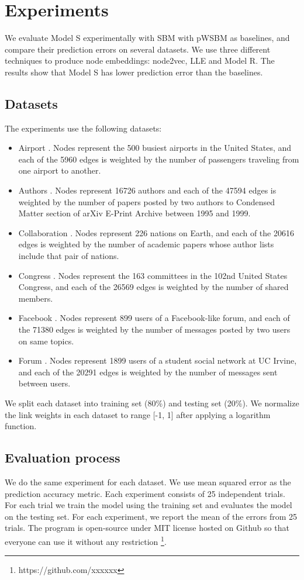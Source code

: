 \documentclass{article} %
\begin{document}
\section{Experiments} \label{section:experiments}
We evaluate Model S experimentally with SBM with pWSBM as baselines,
and compare their prediction errors on several datasets.
We use three different techniques to produce node embeddings: node2vec, LLE and Model R.
The results show 
that Model S has lower prediction error than the baselines.

\subsection{Datasets}
The experiments use the following datasets:
\begin{itemize}
	\item Airport \citep{colizza2007reaction}. Nodes represent the 500 busiest airports in the United States, and each of the 5960 edges is weighted by the number of passengers traveling from one airport to another.
	\item Authors \citep{newman2001structure}. Nodes represent 16726 authors and each of the 47594 edges is weighted by the number of papers posted by two authors to Condensed Matter section of arXiv E-Print Archive between 1995 and 1999.
	\item Collaboration \citep{pan2012world}. Nodes represent 226 nations on Earth, and each of the 20616 edges is weighted by the number of academic papers whose author lists include that pair of nations.
	\item Congress \citep{porter2005network}. Nodes represent the 163 committees in the 102nd United States Congress, and each of the 26569 edges is weighted by the number of shared members.
	\item Facebook \citep{opsahl2013triadic}. Nodes represent 899 users of a Facebook-like forum, and each of the 71380 edges is weighted by the number of messages posted by two users on same topics.
	\item Forum \citep{opsahl2009clustering}. Nodes represent 1899 users of a student social network at UC Irvine, and each of the 20291 edges is weighted by the number of messages sent between users.
\end{itemize}
We split each dataset into training set (80\%) and testing set (20\%).
We normalize the link weights in each dataset to range [-1, 1] after applying a logarithm function.

\subsection{Evaluation process}
We do the same experiment for each dataset.
We use mean squared error as the prediction accuracy metric.
Each experiment consists of 25 independent trials.
For each trial we train the model using the training set and evaluates the model on the testing set.
For each experiment, we report the mean of the errors from 25 trials.
The program is open-source under MIT license hosted on Github
so that everyone can use it without any restriction
\footnote{https://github.com/xxxxxx}.
\end{document}
